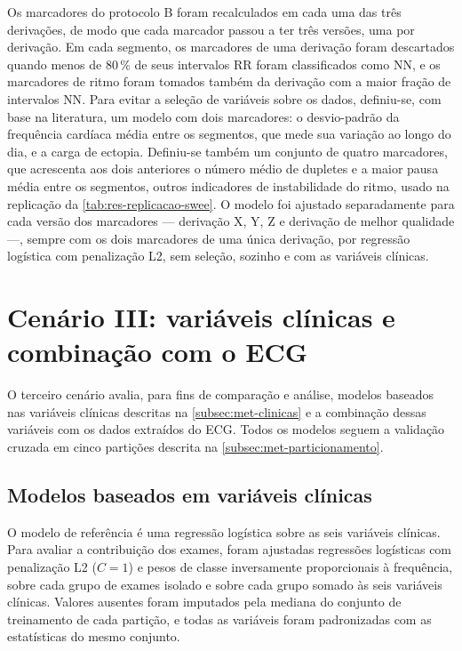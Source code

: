 Os marcadores do protocolo B foram recalculados em cada uma das três
derivações, de modo que cada marcador passou a ter três versões, uma por
derivação. Em cada segmento, os marcadores de uma derivação foram descartados
quando menos de 80\,\% de seus intervalos RR foram classificados como
\gls{NN}, e os marcadores de ritmo foram tomados também da derivação com a
maior fração de intervalos \gls{NN}. Para evitar a seleção de variáveis sobre
os dados, definiu-se, com base na literatura, um modelo com dois marcadores:
o desvio-padrão da frequência cardíaca média entre os segmentos, que mede sua
variação ao longo do dia, e a carga de ectopia. Definiu-se também um
conjunto de quatro marcadores, que acrescenta aos dois anteriores o número
médio de dupletes e a maior pausa média entre os segmentos, outros
indicadores de instabilidade do ritmo, usado na replicação da
\autoref{tab:res-replicacao-swee}. O modelo foi ajustado separadamente para cada versão
dos marcadores --- derivação X, Y, Z e derivação de melhor qualidade ---,
sempre com os dois marcadores de uma única derivação, por regressão
logística com penalização L2, sem seleção, sozinho e com as variáveis
clínicas.




\section{Cenário III: variáveis clínicas e combinação com o ECG}
\label{sec:met-cenario3}

O terceiro cenário avalia, para fins de comparação e análise, modelos
baseados nas variáveis clínicas descritas na \autoref{subsec:met-clinicas}
e a combinação dessas variáveis com os dados extraídos do \gls{ECG}. Todos
os modelos seguem a validação cruzada em cinco partições descrita na
\autoref{subsec:met-particionamento}.

\subsection{Modelos baseados em variáveis clínicas}
\label{subsec:met-modelos-clinicos}

O modelo de referência é uma regressão logística sobre as seis variáveis
clínicas. Para avaliar a contribuição dos exames, foram ajustadas regressões
logísticas com penalização L2 ($C = 1$) e pesos de classe inversamente
proporcionais à frequência, sobre cada grupo de exames isolado e sobre cada
grupo somado às seis variáveis clínicas. Valores ausentes foram imputados
pela mediana do conjunto de treinamento de cada partição, e todas as
variáveis foram padronizadas com as estatísticas do mesmo conjunto.

